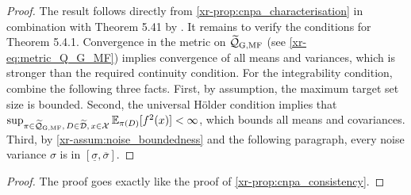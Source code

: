 \documentclass[12pt, twoside]{report}
\newcommand{\xrprefix}[1]{xr-#1}
\begin{document}
\begin{proof}
    The result follows directly from \cref{\xrprefix{prop:cnpa_characterisation}} in combination with Theorem 5.41 by \textcite{Vaart:1998:Asymptotic_Statistics}.
    It remains to verify the conditions for Theorem 5.4.1.
    Convergence in the metric on $\widetilde\Qc\ss{G,MF}$ (see \eqref{\xrprefix{eq:metric_Q_G_MF}}) implies convergence of all means and variances, which is stronger than the required continuity condition.
    For the integrability condition, combine the following three facts.
    First, by assumption, the maximum target set size is bounded.
    Second, the universal H\"older condition implies that $\sup_{\pi \in \widetilde\Qc\ss{G,MF},\,D \in \tD,\, x \in \X} \E_{\pi(D)}[f^2(x)] < \infty$, which bounds all means and covariances.
    Third, by \cref{\xrprefix{assum:noise_boundedness}} and the following paragraph, every noise variance $\sigma$ is in $[\underline{\sigma}, \overline{\sigma}]$. 
\end{proof}

\begin{proof}
    The proof goes exactly like the proof of \cref{\xrprefix{prop:cnpa_consistency}}.
\end{proof}
\end{document}
